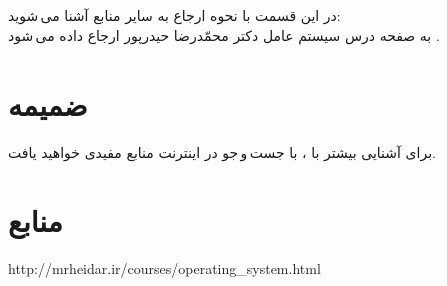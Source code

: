 \documentclass{article}
\begin{document}
\section{}
در این قسمت با نحوه ارجاع به سایر منابع آشنا می\,شوید:\\
\indent
به صفحه درس سیستم عامل دکتر محمّدرضا حیدرپور ارجاع داده می\,شود \cite{b1}.

\section{ضمیمه}
برای آشنایی بیشتر با \lr{\LaTeX}، با جست\,و\,جو در اینترنت منابع مفیدی خواهید یافت.


\section*{منابع}
\renewcommand{\section}[2]{}%
\begin{thebibliography}{99} %


\begin{LTRitems}

\resetlatinfont

 http://mrheidar.ir/courses/operating\_system.html
\end{LTRitems}

\end{thebibliography}
\end{document}
